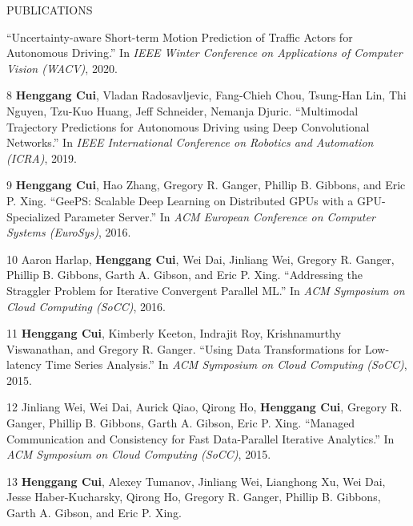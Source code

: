 \documentclass{resume} %
\begin{document}
\begin{rSection}{PUBLICATIONS}
{        ``Uncertainty-aware Short-term Motion Prediction of Traffic Actors for Autonomous Driving.''
        In \emph{IEEE Winter Conference on Applications of Computer Vision (WACV)}, 2020.
    \item
    [8]
        {\bf Henggang Cui}, Vladan Radosavljevic, Fang-Chieh Chou, Tsung-Han Lin, Thi Nguyen, Tzu-Kuo Huang, Jeff Schneider, Nemanja Djuric.
        ``Multimodal Trajectory Predictions for Autonomous Driving using Deep Convolutional Networks.''
        In \emph{IEEE International Conference on Robotics and Automation (ICRA)}, 2019.
    \item
    [9]
        {\bf Henggang Cui}, Hao Zhang, Gregory R. Ganger, Phillip B. Gibbons, and Eric P. Xing.
        ``GeePS: Scalable Deep Learning on Distributed GPUs with a GPU-Specialized Parameter Server.''
        In \emph{ACM European Conference on Computer Systems (EuroSys)}, 2016.
    \item
    [10]
        Aaron Harlap, {\bf Henggang Cui}, Wei Dai, Jinliang Wei, Gregory R. Ganger, Phillip B. Gibbons, Garth A. Gibson, and Eric P. Xing.
        ``Addressing the Straggler Problem for Iterative Convergent Parallel ML.''
        In \emph{ACM Symposium on Cloud Computing (SoCC)}, 2016.
    \item
    [11]
        {\bf Henggang Cui}, Kimberly Keeton, Indrajit Roy, Krishnamurthy Viswanathan, and Gregory R. Ganger.
        ``Using Data Transformations for Low-latency Time Series Analysis.''
        In \emph{ACM Symposium on Cloud Computing (SoCC)}, 2015.
    \item
    [12]
        Jinliang Wei, Wei Dai, Aurick Qiao, Qirong Ho, {\bf Henggang Cui}, Gregory R. Ganger, Phillip B. Gibbons, Garth A. Gibson, Eric P. Xing.
        ``Managed Communication and Consistency for Fast Data-Parallel Iterative Analytics.''
        In \emph{ACM Symposium on Cloud Computing (SoCC)}, 2015.
    \item
    [13]
        {\bf Henggang Cui}, Alexey Tumanov, Jinliang Wei, Lianghong Xu, Wei Dai, Jesse Haber-Kucharsky, Qirong Ho, Gregory R. Ganger, Phillip B. Gibbons, Garth A. Gibson, and Eric P. Xing.
}
\end{rSection}
\end{document}
